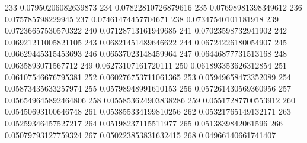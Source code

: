 233 0.07950206082639873
234 0.07822810726879616
235 0.07698981398349612
236 0.075785798229945
237 0.07461474457704671
238 0.07347540101181918
239 0.07236657530570322
240 0.07128713161949685
241 0.07023598732941902
242 0.06921211005821105
243 0.06821451489646622
244 0.06724226180054907
245 0.06629445315453693
246 0.06537023148459964
247 0.06446877731513168
248 0.0635893071567712
249 0.06273107161720111
250 0.061893353626312854
251 0.06107546676795381
252 0.060276753711061365
253 0.05949658473352089
254 0.05873435633257974
255 0.05798948991610153
256 0.057261430569360956
257 0.056549645892464806
258 0.055853624903838286
259 0.05517287700553912
260 0.05450693100646748
261 0.053855334199810256
262 0.05321765149132171
263 0.05259346457527217
264 0.05198237115511977
265 0.0513839842061596
266 0.05079793127759324
267 0.050223853831632415
268 0.04966140661741407
